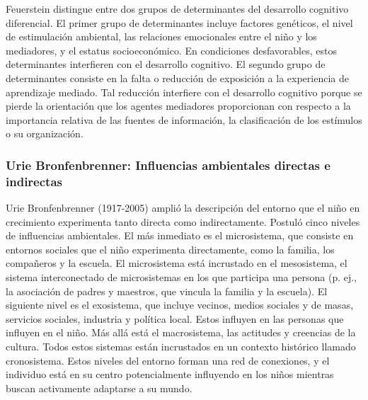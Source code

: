 \documentclass[11pt,letterpaper]{report}
\begin{document}
Feuerstein distingue entre dos grupos de determinantes del desarrollo cognitivo
diferencial. El primer grupo de determinantes incluye factores genéticos, el
nivel de estimulación ambiental, las relaciones emocionales entre el niño y los
mediadores, y el estatus socioeconómico. En condiciones desfavorables, estos
determinantes interfieren con el desarrollo cognitivo. El segundo grupo de
determinantes consiste en la falta o reducción de exposición a la experiencia
de aprendizaje mediado. Tal reducción interfiere con el desarrollo cognitivo
porque se pierde la orientación que los agentes mediadores proporcionan con
respecto a la importancia relativa de las fuentes de información, la
clasificación de los estímulos o su organización. \cite{Feldman3}

\subsubsection{Urie Bronfenbrenner: Influencias ambientales directas e indirectas}
Urie Bronfenbrenner (1917-2005) amplió la descripción del entorno que el niño
en crecimiento experimenta tanto directa como indirectamente. Postuló cinco
niveles de influencias ambientales. El más inmediato es el microsistema, que
consiste en entornos sociales que el niño experimenta directamente, como la
familia, los compañeros y la escuela. El microsistema está incrustado en el
mesosistema, el sistema interconectado de microsistemas en los que participa
una persona (p. ej., la asociación de padres y maestros, que vincula la familia
y la escuela). El siguiente nivel es el exosistema, que incluye vecinos, medios
sociales y de masas, servicios sociales, industria y política local. Estos
influyen en las personas que influyen en el niño. Más allá está el
macrosistema, las actitudes y creencias de la cultura. Todos estos sistemas
están incrustados en un contexto histórico llamado cronosistema. Estos niveles
del entorno forman una red de conexiones, y el individuo está en su centro
potencialmente influyendo en los niños mientras buscan activamente adaptarse a
su mundo. \cite{Feldman3}
\end{document}
